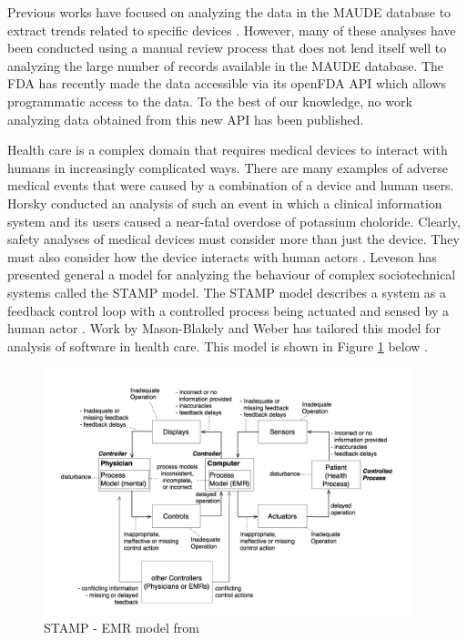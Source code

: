 \documentclass[11pt, notitlepage,abstracton,oneside]{article}   	%
\begin{document}
Previous works have focused on analyzing the data in the MAUDE database to extract trends related to specific devices \cite{weber_preliminary_2011, fuller_electrosurgical_2012}. However, many of these analyses have been conducted using a manual review process that does not lend itself well to analyzing the large number of records available in the MAUDE database. The FDA has recently made the data accessible via its openFDA API which allows programmatic access to the data. To the best of our knowledge, no work analyzing data obtained from this new API has been published.

Health care is a complex domain that requires medical devices to interact with humans in increasingly complicated ways. There are many examples of adverse medical events that were caused by a combination of a device and human users. Horsky conducted an analysis of such an event \cite{horsky_2005} in which a clinical information system and its users caused a near-fatal overdose of potassium choloride. Clearly, safety analyses of medical devices must consider more than just the device. They must also consider how the device interacts with human actors \cite{karsh_health_2010}. Leveson has presented general a model for analyzing the behaviour of complex sociotechnical systems called the STAMP model. The STAMP model describes a system as a feedback control loop with a controlled process being actuated and sensed by a human actor \cite{leveson_engineering_2012}. Work by Mason-Blakely and Weber has tailored this model for analysis of software in health care. This model is shown in Figure \ref{fig:stamp-emr} below \cite{stamp_emr_2011}.

\begin{figure}[ht]
	\centering
	\includegraphics[width=0.95\textwidth]{figures/stamp-emr}
	\caption{STAMP - EMR model from \cite{stamp_emr_2011}}
	\label{fig:stamp-emr}
\end{figure}
\end{document}
